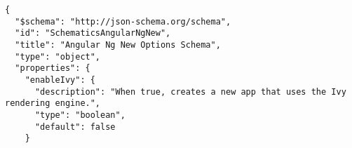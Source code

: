 \begin{verbatim}
{
  "$schema": "http://json-schema.org/schema",
  "id": "SchematicsAngularNgNew",
  "title": "Angular Ng New Options Schema",
  "type": "object",
  "properties": {
    "enableIvy": {
      "description": "When true, creates a new app that uses the Ivy rendering engine.",
      "type": "boolean",
      "default": false
    }
\end{verbatim}
